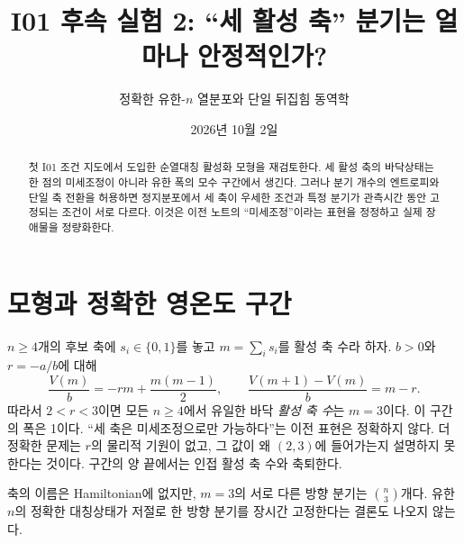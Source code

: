 \documentclass[11pt,a4paper]{article}
\title{I01 후속 실험 2: ``세 활성 축'' 분기는 얼마나 안정적인가?}
\author{정확한 유한-$n$ 열분포와 단일 뒤집힘 동역학}
\date{2026년 10월 2일}
\begin{document}
\maketitle

\begin{abstract}
첫 I01 조건 지도에서 도입한 순열대칭 활성화 모형을 재검토한다.
세 활성 축의 바닥상태는 한 점의 미세조정이 아니라 유한 폭의
모수 구간에서 생긴다. 그러나 분기 개수의 엔트로피와 단일 축
전환을 허용하면 정지분포에서 세 축이 우세한 조건과 특정 분기가
관측시간 동안 고정되는 조건이 서로 다르다. 이것은 이전 노트의
``미세조정''이라는 표현을 정정하고 실제 장애물을 정량화한다.
\end{abstract}

\section{모형과 정확한 영온도 구간}
$n\ge4$개의 후보 축에 $s_i\in\{0,1\}$를 놓고
$m=\sum_i s_i$를 활성 축 수라 하자. $b>0$와 $r=-a/b$에 대해
\begin{equation}
\frac{V(m)}b=-r m+\frac{m(m-1)}2,\qquad
\frac{V(m+1)-V(m)}b=m-r.
\end{equation}
따라서 $2<r<3$이면 모든 $n\ge4$에서 유일한 바닥
\emph{활성 축 수}는 $m=3$이다. 이 구간의 폭은 1이다.
``세 축은 미세조정으로만 가능하다''는 이전 표현은 정확하지 않다.
더 정확한 문제는 $r$의 물리적 기원이 없고, 그 값이 왜
$(2,3)$에 들어가는지 설명하지 못한다는 것이다.
구간의 양 끝에서는 인접 활성 축 수와 축퇴한다.

축의 이름은 Hamiltonian에 없지만, $m=3$의 서로 다른 방향
분기는 $\binom n3$개다. 유한 $n$의 정확한 대칭상태가
저절로 한 방향 분기를 장시간 고정한다는 결론도 나오지 않는다.
\end{document}
